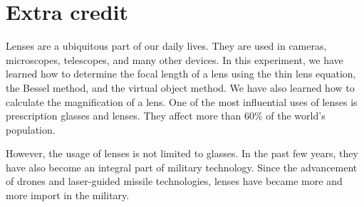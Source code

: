 \documentclass[10pt]{article}
\begin{document}
\section{Extra credit}


Lenses are a ubiquitous part of our daily lives. They are used in cameras, microscopes, telescopes, and many other devices. In this experiment, we have learned how to determine the focal length of a lens using the thin lens equation, the Bessel method, and the virtual object method. We have also learned how to calculate the magnification of a lens.
One of the most influential uses of lenses is prescription glasses and lenses. They affect more than 60\% of the world's population\cite{Parker}.

However, the usage of lenses is not limited to glasses. In the past few years, they have also become an integral part of military technology. Since the advancement of drones and laser-guided missile technologies, lenses have became more and more import in the military. 
\printbibliography
\end{document}
